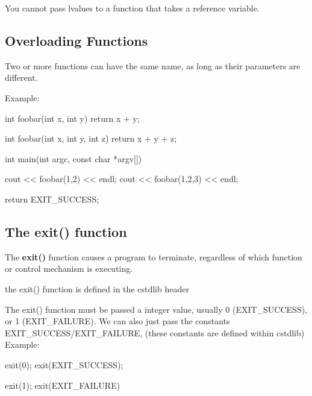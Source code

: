 \documentclass{report}
\begin{document}
    
    \bigbreak \noindent 
    \begin{notebox}
			You cannot pass lvalues to a function that takes a reference variable.
		\end{notebox}
    \bigbreak \noindent 

    \pagebreak \bigbreak \noindent 
    \subsection{Overloading Functions}
    \bigbreak \noindent 
    \begin{concept}
 Two or more functions can have the same name, as long as their parameters are different.
	\end{concept}
    \bigbreak \noindent 
    Example:
    \bigbreak \noindent 
    
    \begin{cppcode}
int foobar(int x, int y) { return x + y; }

int foobar(int x, int y, int z) { return x + y + z; }

int main(int argc, const char *argv[]) {

    cout << foobar(1,2) << endl;
    cout << foobar(1,2,3) << endl;

    return EXIT_SUCCESS;
}
    \end{cppcode}
    

    \bigbreak \noindent \bigbreak \noindent 
    \subsection{The exit() function}
    \bigbreak \noindent 
    \begin{concept}

	\end{concept}
    \bigbreak \noindent 
    The \textbf{exit()} function causes a program to terminate, regardless of which function or control mechanism is executing.
    \bigbreak \noindent 
    \begin{notebox}
			the exit() function is defined in the cstdlib header
		\end{notebox}
    \bigbreak \noindent 
    The exit() function must be passed a integer value, usually 0 (EXIT\_SUCCESS), or 1 (EXIT\_FAILURE). We can also just pass the constants EXIT\_SUCCESS/EXIT\_FAILURE, (these constants are defined within cstdlib)
    Example:
    \bigbreak \noindent 
    
    \begin{cppcode}
exit(0);
exit(EXIT_SUCCESS);

exit(1);
exit(EXIT_FAILURE)
    \end{cppcode}
    
\end{document}

